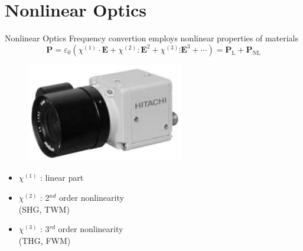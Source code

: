 \documentclass[11pt, leqno]{beamer}
\begin{document}
\section{Nonlinear Optics}
\begin{frame}{Nonlinear Optics}
	Frequency convertion employs nonlinear properties of materials
	\begin{equation}
		\textbf{P} = \varepsilon_0 \left( \chi^{(1)} \cdot \textbf{E} + \chi^{(2)} : \textbf{E}^2 + \chi^{(3)} \vdots \textbf{E}^3 + \cdots \right) = \mathrm{\textbf{P}_L} + \mathrm{\textbf{P}_{NL}}
		\label{eq_P_general}
	\end{equation}
	\begin{figure}
		\centering
		\includegraphics[width=.3\textwidth]{upconverter_HITACHI.png}
	\end{figure}
	\begin{itemize}
	\item	$\chi^{(1)}$	:	linear part
	\item	$\chi^{(2)}$	:	2$^{nd}$ order nonlinearity\\ \hspace{25pt} (SHG, TWM)
	\item	$\chi^{(3)}$	:	3$^{rd}$ order nonlinearity\\ \hspace{25pt} (THG, FWM)
	\end{itemize}
\end{frame}
\end{document}

